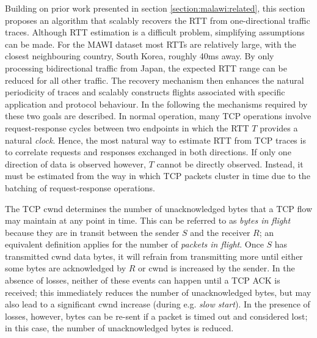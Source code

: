 Building on prior work presented in section \ref{section:malawi:related}, this section proposes an algorithm that scalably recovers the RTT from one-directional traffic traces. 
Although \ac{RTT} estimation is a difficult problem, simplifying assumptions can be made.
For the \ac{MAWI} dataset most \acp{RTT} are relatively large, with the closest neighbouring country, South Korea, roughly 40ms away.
By only processing bidirectional traffic from Japan, the expected \ac{RTT} range can be reduced for all other traffic.
The recovery mechanism then enhances the natural periodicity of traces and scalably constructs flights associated with specific application and protocol behaviour.
In the following the mechanisms required by these two goals are described. 
%
%
In normal operation, many \ac{TCP} operations involve request-response cycles between two endpoints in which the \ac{RTT} $T$ provides a natural \emph{clock}.
Hence, the most natural way to estimate \ac{RTT} from \ac{TCP} traces is to correlate requests and responses exchanged in both directions. 
If only one direction of data is observed however, $T$ cannot be directly observed. 
Instead, it must be estimated from the way in which \ac{TCP} packets cluster in time due to the batching of request-response operations.

The \ac{TCP} \ac{cwnd} determines the number of unacknowledged bytes that a \ac{TCP} flow may maintain at any point in time. 
This can be referred to as \emph{bytes in flight} because they are in transit between the sender $S$ and the receiver $R$; an equivalent definition applies for the number of \emph{packets in flight}. 
Once $S$ has transmitted \ac{cwnd} data bytes, it will refrain from transmitting more until either some bytes are acknowledged by $R$ or \ac{cwnd} is increased by the sender. 
In the absence of losses, neither of these events can happen until a \ac{TCP} \ac{ACK} is received; this immediately reduces the number of unacknowledged bytes, but may also lead to a significant \ac{cwnd} increase (during e.g. \emph{slow start}). 
In the presence of losses, however, bytes can be re-sent if a packet is timed out and considered lost; in this case, the number of unacknowledged bytes is reduced.

